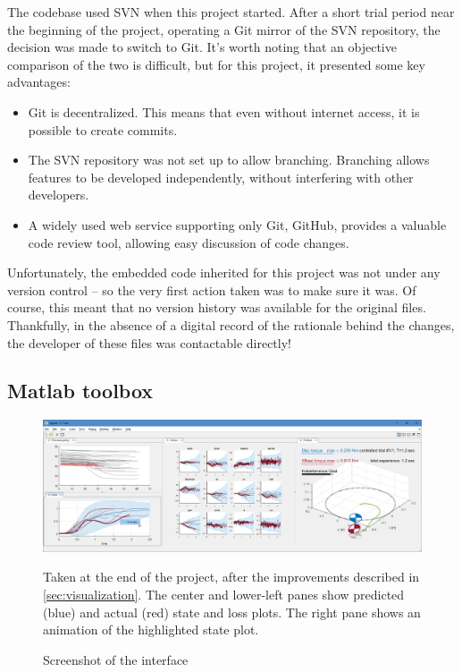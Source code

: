 \documentclass[main.tex]{subfiles}
\begin{document}
	The {\Pilco} codebase used SVN when this project started. After a short trial period near the beginning of the project, operating a Git mirror of the SVN repository, the decision was made to switch to Git. It's worth noting that an objective comparison of the two is difficult, but for this project, it presented some key advantages:
	\begin{itemize}
		\item
			Git is decentralized. This means that even without internet access, it is possible to create commits.

		\item
			The SVN repository was not set up to allow branching. Branching allows features to be developed independently, without interfering with other developers.

		\item
			A widely used web service supporting only Git, GitHub, provides a valuable code review tool, allowing easy discussion of code changes.
	\end{itemize}

	Unfortunately, the embedded code inherited for this project was not under any version control -- so the very first action taken was to make sure it was.
	Of course, this meant that no version history was available for the original files. Thankfully, in the absence of a digital record of the rationale behind the changes, the developer of these files was contactable directly!

	\subsection{Matlab toolbox}

	\begin{figure}[b!]
		\centering
		\includegraphics[width=\linewidth]{figures/pilco.png}
		\caption{Screenshot of the {\Pilco} interface}
		\label{fig:pilco-interface}
		\medskip
		\small
		Taken at the end of the project, after the improvements described in \cref{sec:visualization}.
		The center and lower-left panes show predicted (blue) and actual (red) state and loss plots.
		The right pane shows an animation of the highlighted state plot.
	\end{figure}
\end{document}
